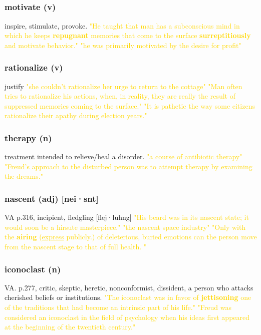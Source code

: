 \documentclass{proc}
\begin{document}
	\newpage
	\subsection{}
	\subsubsection{\textcolor{brickred}{motivate} (v)}
	 inspire, stimulate, provoke.
	\textcolor{gold}{"He taught that man has a 
		subconscious mind in which he keeps \textbf{repugnant} memories 
		that come to the surface \textbf{surreptitiously} and motivate 
		behavior." "he was primarily motivated by the desire for profit"}
	
	\subsubsection{\textcolor{brickred}{rationalize} (v)}
	justify
	\textcolor{gold}{"she couldn't rationalize her urge to return to the cottage" "Man often tries to rationalize his actions, when, in 
		reality, they are really the result of suppressed memories 
		coming to the surface." "It is pathetic the way some citizens rationalize their apathy during election 
		years."}
	
	\subsubsection{\textcolor{brickred}{therapy} (n)}
	\underline{treatment} intended to relieve/heal a disorder.
	\textcolor{gold}{"a course of antibiotic therapy" "Freud's approach to the disturbed 
		person was to attempt therapy by examining the dreams."}
	
	\subsubsection{\textcolor{brickred}{nascent} (adj) [nei·snt]}
	VA p.316, incipient,
	fledgling [flej·luhng]
	\textcolor{gold}{"His beard was in its nascent state; it would soon be a hirsute masterpiece." "the nascent space industry" "Only 
		with the \textbf{airing} (\underline{express} publicly.) of deleterious, buried emotions can the person 
		move from the nascent stage to that of full health. "}
	
	\subsubsection{\textcolor{brickred}{iconoclast} (n)}
	VA. p.277, 
	critic,
	skeptic,
	heretic,
	nonconformist,
	dissident, a person who attacks cherished beliefs or institutions.
	\textcolor{gold}{"The iconoclast was in favor of \textbf{jettisoning} one of the traditions that had become 
		an intrinsic part of his life." "Freud was 
		considered an iconoclast in the field of psychology when his 
		ideas first appeared at the beginning of the twentieth century."}
	
\end{document}
